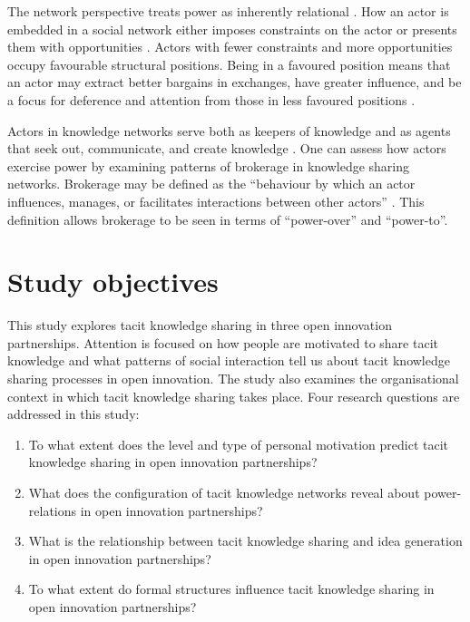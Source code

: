 The network perspective treats power as inherently relational \citep{ibarra1993network}. How an actor is embedded in a social network either imposes constraints on the actor or presents them with opportunities \citep{burt1992structural,simpson2011network}. Actors with fewer constraints and more opportunities occupy favourable structural positions. Being in a favoured position means that an actor may extract better bargains in exchanges, have greater influence, and be a focus for deference and attention from those in less favoured positions \citep{burt1992structural,hanneman2005introduction,simpson2011network}. \medskip

Actors in knowledge networks serve both as keepers of knowledge and as agents that seek out, communicate, and create knowledge \citep{phelps2012knowledge}. One can assess how actors exercise power by examining patterns of brokerage in knowledge sharing networks. Brokerage may be defined as the \enquote{behaviour by which an actor influences, manages, or facilitates interactions between other actors} \citep{obstfeld2014brokerage}. This definition allows brokerage to be seen in terms of \enquote{power-over} and \enquote{power-to}. \medskip
 
\section{Study objectives}

This study explores tacit knowledge sharing in three open innovation partnerships. Attention is focused on how people are motivated to share tacit knowledge and what patterns of social interaction tell us about tacit knowledge sharing processes in open innovation. The study also examines the organisational context in which tacit knowledge sharing takes place. Four research questions are addressed in this study: \medskip

\begin{description}
    \begin{enumerate}
        \item To what extent does the level and type of personal motivation predict tacit knowledge sharing in open innovation partnerships?
	    \item What does the configuration of tacit knowledge networks reveal about power-relations in open innovation partnerships?
	    \item What is the relationship between tacit knowledge sharing and idea generation in open innovation partnerships?
	   \item To what extent do formal structures influence tacit knowledge sharing in open innovation partnerships?
    \end{enumerate}
\end{description}

